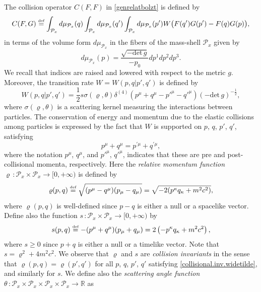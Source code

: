 \documentclass[reqno]{amsart}
\newcommand{\eqdef }{\overset{\mbox{\tiny{def}}}{=}}
\newcommand{\pv}{p}
\newcommand{\qv}{q}
\newcommand{\pM}{p^{\mu}}
\newcommand{\qM}{q^{\mu}}
\def\R{\mathbb R}
\newcommand{\mrel}{\varrho}
\theoremstyle{definition}
\numberwithin{equation}{section}
\numberwithin{theorem}{section}
\begin{document}
The collision operator \(C(F,F)\) in \eqref{genrelatbolzt} is defined by
\begin{equation}\notag 
C(F,G)\eqdef \int_{\mathcal{P}_{x}}d\mu_{\mathcal{P}_{x}}(q)\int_{\mathcal{P}_{x}}d\mu_{\mathcal{P}_{x}}(q')\int_{\mathcal{P}_{x}}d\mu_{\mathcal{P}_{x}}(p')W\big(F(q')G(p')-F(q)G(p)\big),
\end{equation}
in terms of the volume form \(d\mu_{\mathcal{P}_{x}}\) in the fibers of the mass-shell \(\mathcal{P}_{x}\) given by \[d\mu_{\mathcal{P}_{x}}(p)=\frac{\sqrt{-\mathrm{det}\,g}}{-p_0}dp^1dp^2dp^3.\]
We recall that indices are raised and lowered with respect to the metric \(g\). Moreover, the transition rate \(W=W(p,q|p',q')\) is defined by 
\begin{equation}\label{transition_kernel}
W(p,q|p',q')=\frac{1}{2}s\sigma(\varrho, \theta)\delta^{(4)}(p^{\mu}+q^{\mu}-p'^{\mu}-q'^{\mu})(-\mathrm{det}\,g)^{-\frac{1}{2}},
\end{equation}
where \(\sigma(\varrho, \theta)\) is a scattering kernel measuring the interactions between particles. The conservation of energy and momentum due to the elastic collisions among particles is expressed by the fact that \(W\) is supported on \(p\), \(q\), \(p'\), \(q'\), satisfying 
\begin{equation}
p^\mu+q^\mu={\pv}^{\prime\mu}+{\qv}^{\prime\mu},
\label{collisional.inv.widetilde}
\end{equation}
where the notation \(p^{\mu}\), \(q^{\mu}\), and \(p'^{\mu}\), \(q'^{\mu}\), indicates that these are pre and post-collisional momenta, respectively. Here the \emph{relative momentum function} \(\mrel\,\colon \mathcal{P}_x\times \mathcal{P}_x\to [0,+\infty) \) is defined by
\begin{align}\notag 
\mrel(p,q) 
\eqdef
\sqrt{(\pM-\qM) (p_\mu-q_\mu)}
 =\sqrt{-2(\pv^\kappa \qv_\kappa + m^2c^2) },
\end{align}
where \(\varrho(p,q)\) is well-defined since \(p-q\) is either a null or a spacelike vector. Define also the function \(s\,\colon \mathcal{P}_x\times \mathcal{P}_x\to [0,+\infty) \) by 
\begin{align}\notag 
    s(p,q)
\eqdef
-(\pM+\qM) (p_\mu+q_\mu)
=2\left( -\pv^\kappa \qv_\kappa + m^2c^2 \right),
\end{align}
where \(s\geq 0\) since \(p+q\) is  either a null or a timelike vector. Note that \(s=\varrho^2+4m^2c^2.\) We observe that \(\varrho\) and \(s\) are \emph{collision invariants} in the sense that \(\varrho(p,q)=\varrho(p',q')\) for all \(p\), \(q\), \(p'\), \(q'\) satisfying \eqref{collisional.inv.widetilde}, and similarly for \(s\). We define also the \emph{scattering angle function} \(\theta \,\colon \mathcal{P}_x\times \mathcal{P}_x\times \mathcal{P}_x\times \mathcal{P}_x\to \R\) as
\end{document}

